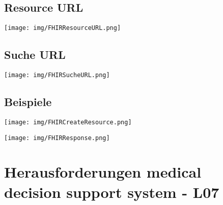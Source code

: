 \documentclass{report}
\newenvironment{Figure}
	{\par\medskip\noindent\minipage{\linewidth}}
	{\endminipage\par\medskip}
\theoremstyle{definition}
\theoremstyle{example}
\begin{document}
\section{Resource URL}
\begin{Figure}
   \centering
   \texttt{[image: img/FHIRResourceURL.png]}
      \label{fig:Zusammensetzung Resource URL in FHIR}
\end{Figure}

\section{Suche URL}
\begin{Figure}
   \centering
   \texttt{[image: img/FHIRSucheURL.png]}
      \label{fig:Zusammensetzung Suche URL in FHIR}
\end{Figure}

\section{Beispiele}

\begin{Figure}
   \centering
   \texttt{[image: img/FHIRCreateResource.png]}
      \label{fig:Beispiel Resource erstellen}
\end{Figure}

\begin{Figure}
   \centering
   \texttt{[image: img/FHIRResponse.png]}
      \label{fig:Beispiel FHIR Response}
\end{Figure}

\chapter{Herausforderungen medical decision support system - L07}
\end{document}
